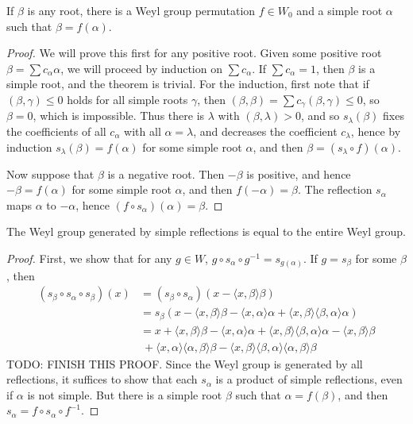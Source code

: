 \begin{theorem}
    If $\beta$ is any root, there is a Weyl group permutation $f \in W_0$ and a simple root $\alpha$ such that $\beta = f(\alpha)$.
\end{theorem}
\begin{proof}
    We will prove this first for any positive root. Given some positive root $\beta = \sum c_\alpha \alpha$, we will proceed by induction on $\sum c_\alpha$. If $\sum c_\alpha = 1$, then $\beta$ is a simple root, and the theorem is trivial. For the induction, first note that if $(\beta, \gamma) \leq 0$ holds for all simple roots $\gamma$, then $(\beta, \beta) = \sum c_\gamma (\beta, \gamma) \leq 0$, so $\beta = 0$, which is impossible. Thus there is $\lambda$ with $(\beta, \lambda) > 0$, and so $s_\lambda(\beta)$ fixes the coefficients of all $c_\alpha$ with all $\alpha = \lambda$, and decreases the coefficient $c_\lambda$, hence by induction $s_\lambda(\beta) = f(\alpha)$ for some simple root $\alpha$, and then $\beta = (s_\lambda \circ f)(\alpha)$.

    Now suppose that $\beta$ is a negative root. Then $-\beta$ is positive, and hence $-\beta = f(\alpha)$ for some simple root $\alpha$, and then $f(-\alpha) = \beta$. The reflection $s_\alpha$ maps $\alpha$ to $-\alpha$, hence $(f \circ s_\alpha)(\alpha) = \beta$.
\end{proof}

\begin{corollary}
    The Weyl group generated by simple reflections is equal to the entire Weyl group.
\end{corollary}
\begin{proof}
    First, we show that for any $g \in W$, $g \circ s_\alpha \circ g^{-1} = s_{g(\alpha)}$. If $g = s_\beta$ for some $\beta$, then
    \begin{align*}
        (s_\beta \circ s_\alpha \circ s_\beta)(x) &= (s_\beta \circ s_\alpha)(x - \langle x, \beta \rangle \beta)\\
        &= s_\beta(x - \langle x, \beta \rangle \beta - \langle x, \alpha \rangle \alpha + \langle x, \beta \rangle \langle \beta, \alpha \rangle \alpha)\\
        &= x + \langle x, \beta \rangle \beta - \langle x, \alpha \rangle \alpha + \langle x, \beta \rangle \langle \beta, \alpha \rangle \alpha - \langle x, \beta \rangle \beta\\
        &\ + \langle x, \alpha \rangle \langle \alpha, \beta \rangle \beta - \langle x ,\beta \rangle \langle \beta, \alpha \rangle \langle \alpha, \beta \rangle \beta
    \end{align*}
    TODO: FINISH THIS PROOF. Since the Weyl group is generated by all reflections, it suffices to show that each $s_\alpha$ is a product of simple reflections, even if $\alpha$ is not simple. But there is a simple root $\beta$ such that $\alpha = f(\beta)$, and then $s_\alpha = f \circ s_\alpha \circ f^{-1}$.
\end{proof}


